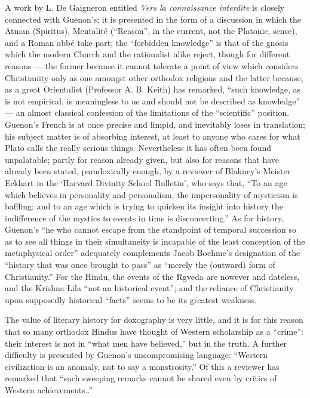 A work by L. De Gaigneron entitled \emph{Vers la connaissance interdite} is closely connected with Guenon's; it is presented in the form of a discussion in which the Atman (Spiritus), Mentalité (``Reason'', in the current, not the Platonic, sense), and a Roman abbé take part; the ``forbidden knowledge'' is that of the gnosis which the modern Church and the rationalist alike reject, though for different reasons --- the former because it cannot tolerate a point of view which considers Christianity only as one amongst other orthodox religions and the latter because, as a great Orientalist (Professor A. B. Keith) has remarked, ``such knowledge, as is not empirical, is meaningless to us and should not be described as knowledge'' --- an almost classical confession of the limitations of the ``scientific'' position. Guenon's French is at once precise and limpid, and inevitably loses in translation; his subject matter is of absorbing interest, at least to anyone who cares for what Plato calls the really serious things. Nevertheless it has often been found unpalatable; partly for reason already given, but also for reasons that have already been stated, paradoxically enough, by a reviewer of Blakney's Meister Eckhart in the `Harvard Divinity School Bulletin', who says that, ``To an age which believes in personality and personalism, the impersonality of mysticism is baffling; and to an age which is trying to quicken its insight into history the indifference of the mystics to events in time is disconcerting.'' As for history, Guenon's ``he who cannot escape from the standpoint of temporal succession so as to see all things in their simultaneity is incapable of the least conception of the metaphysical order'' adequately complements Jacob Boehme's designation of the ``history that was once brought to pass'' as ``merely the (outward) form of Christianity.'' For the Hindu, the events of the Rgveda are nowever and dateless, and the Krishna Lila ``not an historical event''; and the reliance of Christianity upon supposedly historical ``facts'' seems to be its greatest weakness.

The value of literary history for doxography is very little, and it is for this reason that so many orthodox Hindus have thought of Western scholarship as a ``crime'': their interest is not in ``what men have believed,'' but in the truth. A further difficulty is presented by Guenon's uncompromising language: ``Western civilization is an anomaly, not to say a monstrosity.'' Of this a reviewer has remarked that ``such sweeping remarks cannot be shared even by critics of Western achievements..''

